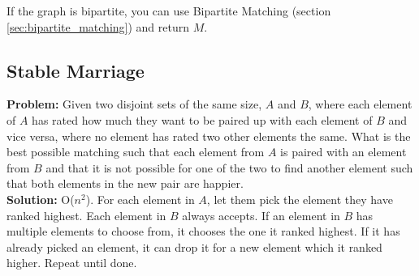 \documentclass[a4paper,10pt]{article}
\begin{document}
\begin{multicols}{2}
If the graph is bipartite, you can use Bipartite Matching (section \ref{sec:bipartite_matching}) and return $M$.

\subsection{Stable Marriage}
\textbf{Problem:} Given two disjoint sets of the same size, $A$ and $B$, where each element of $A$ has rated how much they want to be paired up with each element of $B$ and vice versa, where no element has rated two other elements the same. What is the best possible matching such that each element from $A$ is paired with an element from $B$ and that it is not possible for one of the two to find another element such that both elements in the new pair are happier.\\
\textbf{Solution:} O($n^2$). For each element in $A$, let them pick the element they have ranked highest. Each element in $B$ always accepts. If an element in $B$ has multiple elements to choose from, it chooses the one it ranked highest. If it has already picked an element, it can drop it for a new element which it ranked higher. Repeat until done.
\end{multicols}
\end{document}
